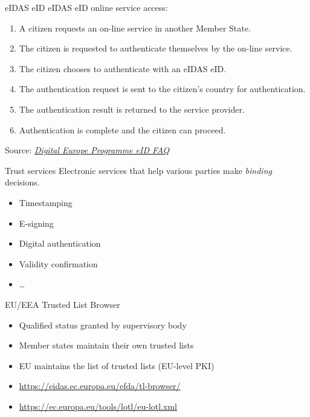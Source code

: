 \begin{frame}{eIDAS eID}
  eIDAS eID online service access:
  \begin{enumerate}[<+(1)->]
    \item A citizen requests an on-line service in another Member State.
    \item The citizen is requested to authenticate themselves by the on-line service.
    \item The citizen chooses to authenticate with an eIDAS eID.
    \item The authentication request is sent to the citizen's country for authentication.
    \item The authentication result is returned to the service provider.
    \item Authentication is complete and the citizen can proceed.
  \end{enumerate}

  \pause
  {\scriptsize Source: \href{https://ec.europa.eu/digital-building-blocks/sites/display/DIGITAL/eID}{\textit{Digital Europe Programme eID FAQ}}}
\end{frame}

\begin{frame}{Trust services}
  Electronic services that help various parties make \emph{binding} decisions.
  \begin{itemize}[<+(1)->]
    \item Timestamping
    \item E-signing
    \item Digital authentication
    \item Validity confirmation
    \item \dots
  \end{itemize}

  \pause
  EU/EEA Trusted List Browser
  \begin{itemize}[<+(1)->]
    \item Qualified status granted by supervisory body
    \item Member states maintain their own trusted lists
    \item EU maintains the list of trusted lists (EU-level PKI)
    \item {\scriptsize \url{https://eidas.ec.europa.eu/efda/tl-browser/}}
    \item {\scriptsize \url{https://ec.europa.eu/tools/lotl/eu-lotl.xml}}
  \end{itemize}
\end{frame}

